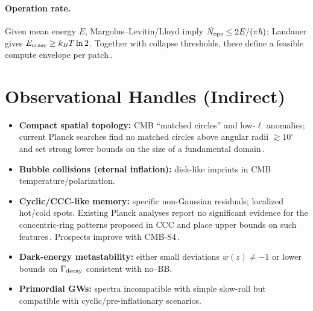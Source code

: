 \documentclass[12pt]{article}
\theoremstyle{remark}
\begin{document}
\paragraph{Operation rate.} Given mean energy $E$, Margolus--Levitin/Lloyd imply $\dot N_{\rm ops} \le 2E/(\pi\hbar)$; Landauer gives $E_{\rm erase}\ge k_B T \ln 2$. Together with collapse thresholds, these define a feasible compute envelope per patch\,\cite{MargolusLevitin1998,Lloyd2000}.

\section{Observational Handles (Indirect)}
\begin{itemize}[leftmargin=1.2em]
  \item \textbf{Compact spatial topology:} CMB ``matched circles'' and low-$\ell$ anomalies; current Planck searches find no matched circles above angular radii $\gtrsim 10^{\circ}$ and set strong lower bounds on the size of a fundamental domain\,\cite{CornishSpergelStarkman1998,Planck2016Topology}.
  \item \textbf{Bubble collisions (eternal inflation):} disk-like imprints in CMB temperature/polarization.
  \item \textbf{Cyclic/CCC-like memory:} specific non-Gaussian residuals; localized hot/cold spots. Existing Planck analyses report no significant evidence for the concentric-ring patterns proposed in CCC and place upper bounds on such features\,\cite{WehusEriksen2011,Planck2015Isotropy}. Prospects improve with CMB-S4\,\cite{CMBS4SB}.
  \item \textbf{Dark-energy metastability:} either small deviations $w(z)\neq -1$ or lower bounds on $\Gamma_{\rm decay}$ consistent with no--BB.
  \item \textbf{Primordial GWs:} spectra incompatible with simple slow-roll but compatible with cyclic/pre-inflationary scenarios.
\end{itemize}
\end{document}
